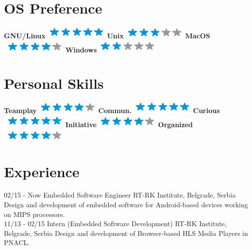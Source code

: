 \documentclass[]{rankovic-cv}
\begin{document}
\begin{aside}
  \section{OS Preference}
    \textbf{GNU/Linux}\includegraphics[scale=0.40]{img/5stars.png}
    \textbf{Unix}\includegraphics[scale=0.40]{img/3stars.png}
    \textbf{MacOS}\includegraphics[scale=0.40]{img/4stars.png}
    \textbf{Windows}\includegraphics[scale=0.40]{img/2stars.png}
    ~
  \section{Personal Skills}
    \textbf{Teamplay}\includegraphics[scale=0.40]{img/4stars.png}
    \textbf{Commun.}\includegraphics[scale=0.40]{img/5stars.png}
    \textbf{Curious}\includegraphics[scale=0.40]{img/5stars.png}
    \textbf{Initiative}\includegraphics[scale=0.40]{img/4stars.png}
    \textbf{Organized}\includegraphics[scale=0.40]{img/4stars.png}
    ~
\end{aside}

\section{Experience}
\begin{entrylist}
  \entry
    {02/15 - Now}
    {Embedded Software Engineer}
    {RT-RK Institute, Belgrade, Serbia}
    {Design and development of embedded software     for Android-based devices working on MIPS processors.\\}
  \entry
    {11/13 - 02/15}
    {Intern (Embedded Software Development)}
    {RT-RK Institute, Belgrade, Serbia}
    {Design and development of Browser-based HLS Media Players in PNACL.\\}
\end{entrylist}
~
\end{document}
